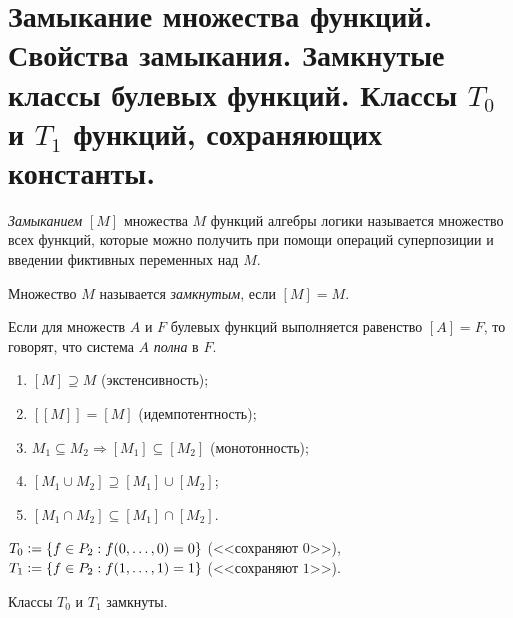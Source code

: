 \section{Замыкание множества функций. Свойства замыкания. Замкнутые классы булевых функций. Классы $T_0$ и $T_1$ функций, сохраняющих константы.}

\begin{definition}
    \textit{Замыканием} $[M]$ множества $M$ функций алгебры логики называется множество всех функций, которые можно получить при помощи операций суперпозиции и введении фиктивных переменных над $M$.
\end{definition}

\begin{definition}
    Множество $M$ называется \textit{замкнутым}, если $[M] = M$.
\end{definition}

\begin{definition}
    Если для множеств $A$ и $F$ булевых функций выполняется равенство $[A] = F$, то говорят, что система $A$ \textit{полна} в $F$.
\end{definition}

\begin{theorem}
    \begin{enumerate}[nolistsep]
        \item $[M] \supseteq M$ (экстенсивность);
        \item $[[M]] = [M]$ (идемпотентность);
        \item $M_1 \subseteq M_2 \Rightarrow [M_1] \subseteq [M_2]$ (монотонность);
        \item $[M_1 \cup M_2] \supseteq [M_1] \cup [M_2]$;
        \item $[M_1 \cap M_2] \subseteq [M_1] \cap [M_2]$.
    \end{enumerate}
\end{theorem}

\begin{definition}
    $T_0 \vcentcolon = \{f \in P_2: f(0, \ldots, 0) = 0\}$ (<<сохраняют $0$>>), $T_1 \vcentcolon = \{f \in P_2: f(1, \ldots, 1) = 1\}$ (<<сохраняют $1$>>).
\end{definition}

\begin{theorem}
    Классы $T_0$ и $T_1$ замкнуты.
\end{theorem}

